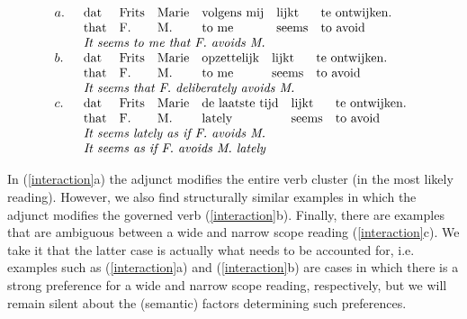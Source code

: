 \begin{equation}
\label{interaction}
\begin{array}[t]{ll}
a. & 
\begin{array}[t]{llllll}
\mbox{dat} & \mbox{Frits} & \mbox{Marie} & \mbox{volgens mij} & \mbox{lijkt} & 
\mbox{te ontwijken.} \\
\mbox{that} & \mbox{F.}& \mbox{M.}& \mbox{to me} & \mbox{seems} & \mbox{to 
avoid} \\
\multicolumn{6}{l}{\mbox{\em It seems to me that F. avoids M.}} 
\end{array} \\
b. & 
\begin{array}[t]{llllll}
\mbox{dat}& \mbox{Frits} & \mbox{Marie} & \mbox{opzettelijk} & \mbox{lijkt} & 
\mbox{te 
ontwijken.} \\
\mbox{that}& \mbox{F.} &\mbox{M.} & \mbox{to me} & \mbox{seems} & \mbox{to 
avoid} \\
\multicolumn{6}{l}{\mbox{\em It seems that F. deliberately avoids M.}} 
\end{array} \\
c. & 
\begin{array}[t]{llllll}
\mbox{dat} & \mbox{Frits} & \mbox{Marie} & \mbox{de laatste tijd} & \mbox{lijkt} 
& 
\mbox{te ontwijken.}  \\
\mbox{that}& \mbox{F.} &\mbox{M.} & \mbox{lately} & \mbox{seems} & \mbox{to 
avoid} \\
\multicolumn{6}{l}{\mbox{\em It seems lately as if  F. avoids M.}} \\
\multicolumn{6}{l}{\mbox{\em It seems as if  F. avoids M. lately}} 
\end{array}
\end{array}
\end{equation}

\noindent In (\ref{interaction}a) the adjunct modifies the entire verb cluster
(in the most likely reading).  However, we also find structurally similar
examples in which the adjunct modifies the governed verb (\ref{interaction}b).
Finally, there are examples that are ambiguous between a wide and narrow scope
reading (\ref{interaction}c).  We take it that the latter case is actually what
needs to be accounted for, i.e.  examples such as (\ref{interaction}a) and
(\ref{interaction}b) are cases in which there is a strong preference for a wide
and narrow scope reading, respectively, but we will remain silent about the
(semantic) factors determining such preferences.


